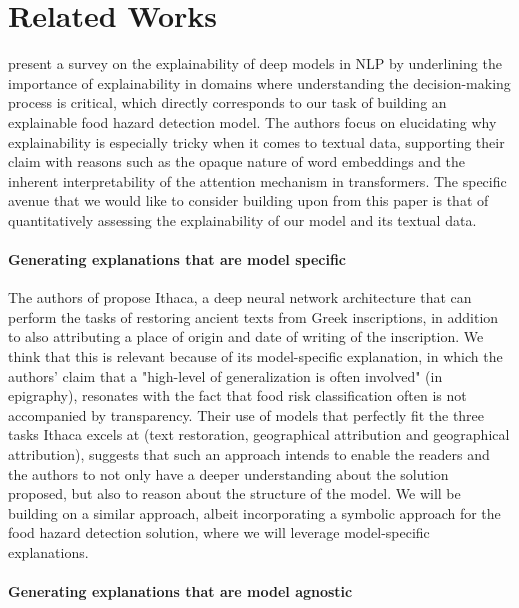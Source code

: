 \documentclass[11pt]{article}
\begin{document}
\section{Related Works}


\cite{10.1145/3529755} present a survey on the explainability of deep models in NLP by underlining the importance of explainability in domains where understanding the decision-making process is critical, which directly corresponds to our task of building an explainable food hazard detection model. The authors focus on elucidating why explainability is especially tricky when it comes to textual data, supporting their claim with reasons such as the opaque nature of word embeddings and the inherent interpretability of the attention mechanism in transformers. The specific avenue that we would like to consider building upon from this paper is that of quantitatively assessing the explainability of our model and its textual data.


\paragraph{Generating explanations that are model specific}


The authors of \cite{assael2022restoring} propose Ithaca, a deep neural network architecture that can perform the tasks of restoring ancient texts from Greek inscriptions, in addition to also attributing a place of origin and date of writing of the inscription. We think that this is relevant because of its model-specific explanation, in which the authors' claim that a "high-level of generalization is often involved" (in epigraphy), resonates with the fact that food risk classification often is not accompanied by transparency. Their use of models that perfectly fit the three tasks Ithaca excels at (text restoration, geographical attribution and geographical attribution), suggests that such an approach intends to enable the readers and the authors to not only have a deeper understanding about the solution proposed, but also to reason about the structure of the model. We will be building on a similar approach, albeit incorporating a symbolic approach for the food hazard detection solution, where we will leverage model-specific explanations.

\paragraph{Generating explanations that are model agnostic}
\end{document}
